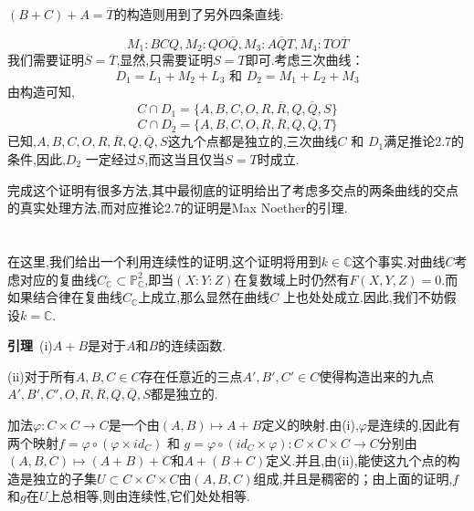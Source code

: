 \documentclass[UTF8]{book}
\begin{document}
		$(B+C)+A=\overline{T}$的构造则用到了另外四条直线:
		
		\begin{equation*}
			M_{1}:BCQ,M_{2}:QO\overline{Q},M_{3}:A\overline{Q}T,M_{4}:TO\overline{T}
		\end{equation*}
		我们需要证明$\overline{S}=\overline{T}$,显然,只需要证明$S=T$即可.考虑三次曲线：
		\begin{equation*}
		D_{1}=L_{1}+M_{2}+L_{3} \text { 和 }D_{2}=M_{1}+L_{2}+M_{3}
		\end{equation*}
		由构造可知,
		\begin{equation*}
		C \cap D_{1}=\{A, B, C, O,R, \overline{R}, Q, \overline{Q}, S\}
		\end{equation*}
		\begin{equation*}
		C \cap D_{2}=\{A, B, C, O,R, \overline{R}, Q, \overline{Q}, T\}
		\end{equation*}
		已知,$ A, B, C, O,R, \overline{R}, Q, \overline{Q}, S $这九个点都是独立的,三次曲线$ C $ 和 $ D_{1} $满足推论2.7的条件,因此,$ D_{2} $ 一定经过$ S $,而这当且仅当$S=T$时成立.
		
		
		完成这个证明有很多方法,其中最彻底的证明给出了考虑多交点的两条曲线的交点的真实处理方法,而对应推论2.7的证明是Max Noether的引理.
		
	\section{}
		在这里,我们给出一个利用连续性的证明,这个证明将用到$ k \in \mathbb{C} $这个事实.对曲线$ C $考虑对应的复曲线$C_{\mathbb{C}} \subset \mathbb{P}^{2}_\mathbb{C}$,即当$ (X:Y:Z) $在复数域上时仍然有$ F(X,Y,Z)=0 $.而如果结合律在复曲线$ C_{\mathbb{C}} $上成立,那么显然在曲线$ C $ 上也处处成立.因此,我们不妨假设$ k = \mathbb{C} $.
		
		\textbf{引理}\ (i)$ A+B $是对于$ A $和$ B $的连续函数.
		
		
		(ii)对于所有$ A,B,C \in C $存在任意近的三点$ A',B',C' \in C $使得构造出来的九点$ A', B', C', O,R, \overline{R}, Q, \overline{Q}, S $都是独立的.
		
		
		加法$\varphi: C \times C \rightarrow C$是一个由$(A, B) \mapsto A+B$定义的映射.由(i),$ \varphi $是连续的,因此有两个映射$f=\varphi \circ(\varphi \times id_{C})$  和  $g=\varphi \circ(id_{C} \times \varphi): C \times C \times C \rightarrow C$分别由$(A, B,C) \mapsto (A+B)+C$和$ A+(B+C )$定义.并且,由(ii),能使这九个点的构造是独立的子集$ U \subset C \times C \times C  $由$ (A,B,C) $组成,并且是稠密的；由上面的证明,$ f $和$ g $在$ U $上总相等,则由连续性,它们处处相等.
		
\end{document}

